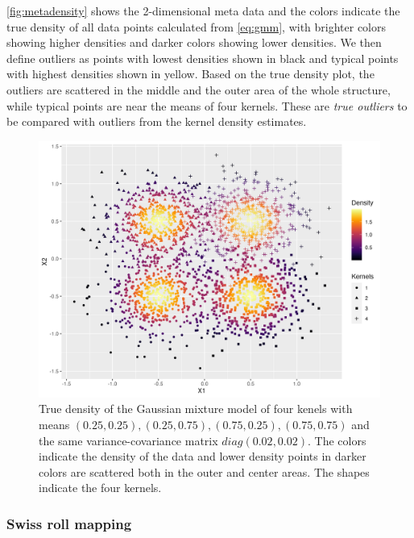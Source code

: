 \documentclass[11pt,a4paper,]{article}
\begin{document}
\autoref{fig:metadensity} shows the 2-dimensional meta data and the colors indicate the true density of all data points calculated from \eqref{eq:gmm}, with brighter colors showing higher densities and darker colors showing lower densities. We then define outliers as points with lowest densities shown in black and typical points with highest densities shown in yellow. Based on the true density plot, the outliers are scattered in the middle and the outer area of the whole structure, while typical points are near the means of four kernels. These are \emph{true outliers} to be compared with outliers from the
kernel density estimates.

\begin{figure}

{\centering \includegraphics[width=0.8\linewidth]{figures/truedensity_4kernels} 

}

\caption{True density of the Gaussian mixture model of four kenels with means $(0.25, 0.25), (0.25, 0.75), (0.75, 0.25), (0.75, 0.75)$ and the same variance-covariance matrix $diag(0.02, 0.02)$. The colors indicate the density of the data and lower density points in darker colors are scattered both in the outer and center areas. The shapes indicate the four kernels.}\label{fig:metadensity}
\end{figure}

\hypertarget{swiss-roll-mapping}{%
\subsubsection{Swiss roll mapping}\label{swiss-roll-mapping}}
\end{document}
